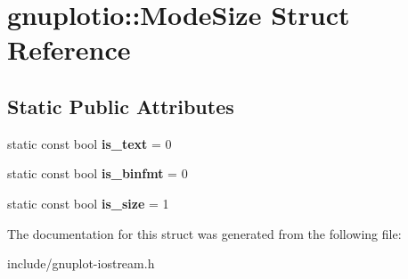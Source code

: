\hypertarget{structgnuplotio_1_1ModeSize}{}\section{gnuplotio\+:\+:Mode\+Size Struct Reference}
\label{structgnuplotio_1_1ModeSize}
\subsection*{Static Public Attributes}
\begin{DoxyCompactItemize}
\item 
\mbox{\label{structgnuplotio_1_1ModeSize_aa01840f76877ae7c8bad254dae28e32c}} 
static const bool {\bfseries is\+\_\+text} = 0
\item 
\mbox{\label{structgnuplotio_1_1ModeSize_ac5243e8e4910f2f6a2724b9fc0de4ff9}} 
static const bool {\bfseries is\+\_\+binfmt} = 0
\item 
\mbox{\label{structgnuplotio_1_1ModeSize_aa20ae9f1ce222504489db33d13eb46c0}} 
static const bool {\bfseries is\+\_\+size} = 1
\end{DoxyCompactItemize}


The documentation for this struct was generated from the following file\+:\begin{DoxyCompactItemize}
\item 
include/gnuplot-\/iostream.\+h\end{DoxyCompactItemize}
